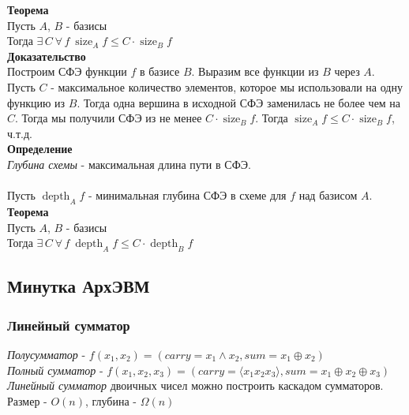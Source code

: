\documentclass[12pt]{article}
\begin{document}
\textbf{Теорема}\\
Пусть $A$, $B$ - базисы\\
Тогда $\exists\,C\ \forall\,f\ \operatorname{size}_A f \leq C\cdot\operatorname{size}_B f$\\
\textbf{Доказательство}\\
Построим СФЭ функции $f$ в базисе $B$. Выразим все функции из $B$ через $A$. Пусть $C$ - максимальное количество элементов, которое мы использовали на одну функцию из $B$. Тогда одна вершина в исходной СФЭ заменилась не более чем на $C$. Тогда мы получили СФЭ из не менее $C\cdot\operatorname{size}_B f$. Тогда $\operatorname{size}_A f \leq C\cdot\operatorname{size}_B f$, ч.т.д. \\
\textbf{Определение}\\
\textit{Глубина схемы} - максимальная длина пути в СФЭ.\\\\
Пусть $\operatorname{depth}_A f$ - минимальная глубина СФЭ в схеме для $f$ над базисом $A$.\\
\textbf{Теорема}\\
Пусть $A$, $B$ - базисы\\
Тогда $\exists\,C\ \forall\,f\ \operatorname{depth}_A f \leq C\cdot\operatorname{depth}_B f$\\
\subsection{Минутка АрхЭВМ}
\subsubsection{Линейный сумматор}
\textit{Полусумматор} - $f(x_1, x_2) = (carry = x_1 \land x_2, sum = x_1 \oplus x_2)$\\
\textit{Полный сумматор} - $f(x_1, x_2, x_3) = (carry = \langle x_1 x_2 x_3 \rangle, sum = x_1 \oplus x_2 \oplus x_3)$\\
\textit{Линейный сумматор} двоичных чисел можно построить каскадом сумматоров.\\
Размер - $O(n)$, глубина - $\Omega(n)$\\\\
\end{document}
